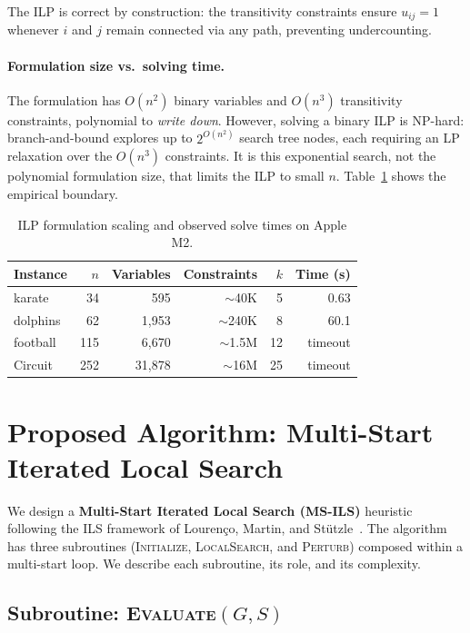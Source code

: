 \documentclass[11pt,a4paper]{article}
\begin{document}
The ILP is correct by construction: the transitivity constraints ensure $u_{ij} = 1$ whenever $i$ and $j$ remain connected via any path, preventing undercounting.

\paragraph{Formulation size vs.\ solving time.} The formulation has $O(n^2)$ binary variables and $O(n^3)$ transitivity constraints, polynomial to \emph{write down}. However, solving a binary ILP is NP-hard: branch-and-bound explores up to $2^{O(n^2)}$ search tree nodes, each requiring an LP relaxation over the $O(n^3)$ constraints. It is this exponential search, not the polynomial formulation size, that limits the ILP to small $n$. Table~\ref{tab:ilp_scaling} shows the empirical boundary.

\begin{table}[ht]
\centering
\caption{ILP formulation scaling and observed solve times on Apple M2.}
\label{tab:ilp_scaling}
\begin{tabular}{lrrrrr}
\toprule
Instance & $n$ & Variables & Constraints & $k$ & Time (s) \\
\midrule
karate & 34 & 595 & $\sim$40K & 5 & 0.63 \\
dolphins & 62 & 1{,}953 & $\sim$240K & 8 & 60.1 \\
football & 115 & 6{,}670 & $\sim$1.5M & 12 & timeout \\
Circuit & 252 & 31{,}878 & $\sim$16M & 25 & timeout \\
\bottomrule
\end{tabular}
\end{table}

\section{Proposed Algorithm: Multi-Start Iterated Local Search}
\label{sec:msils}

We design a \textbf{Multi-Start Iterated Local Search (MS-ILS)} heuristic following the ILS framework of Louren\c{c}o, Martin, and St\"utzle~\cite{lourenco2003}. The algorithm has three subroutines (\textsc{Initialize}, \textsc{LocalSearch}, and \textsc{Perturb}) composed within a multi-start loop. We describe each subroutine, its role, and its complexity.

\subsection{Subroutine: \textsc{Evaluate}$(G, S)$}
\end{document}
